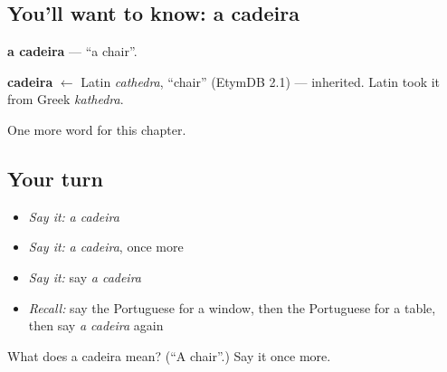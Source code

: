 \subsection*{You'll want to know: a cadeira}
\textbf{a cadeira} — \textquotedblleft{}a chair\textquotedblright{}.

\begin{cousinweb}
\textbf{cadeira} $\leftarrow$ Latin \emph{cathedra}, \textquotedblleft{}chair\textquotedblright{} (EtymDB 2.1) — inherited. Latin took it from Greek \emph{kathedra}.
\end{cousinweb}

\begin{grammarlens}[title={What you've built}]
One more word for this chapter.
\end{grammarlens}

\subsection*{Your turn}
\begin{itemize}
\raggedright
  \item \emph{Say it:} \emph{a cadeira}
  \item \emph{Say it:} \emph{a cadeira}, once more
  \item \emph{Say it:} say \emph{a cadeira}
  \item \emph{Recall:} say the Portuguese for a window, then the Portuguese for a table, then say \emph{a cadeira} again
\end{itemize}

\begin{tcolorbox}[breakable,colback=teal!4,colframe=teal!35!black,title={Before you move on}]
What does a cadeira mean? (\textquotedblleft{}A chair\textquotedblright{}.) Say it once more.
\end{tcolorbox}
